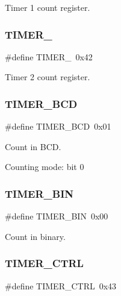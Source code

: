 Timer 1 count register. 

\hypertarget{group__i8254_ga1f34f18ad0ab8cace46b615773b48735}{}\label{group__i8254_ga1f34f18ad0ab8cace46b615773b48735} 
\subsubsection{\texorpdfstring{T\+I\+M\+E\+R\+\_}{TIMER\_2}}
{\footnotesize\ttfamily \#define T\+I\+M\+E\+R\+\_~0x42}



Timer 2 count register. 

\hypertarget{group__i8254_ga325b992a371d5d981c4eceff42fa5956}{}\label{group__i8254_ga325b992a371d5d981c4eceff42fa5956} 
\subsubsection{\texorpdfstring{T\+I\+M\+E\+R\+\_\+\+B\+CD}{TIMER\_BCD}}
{\footnotesize\ttfamily \#define T\+I\+M\+E\+R\+\_\+\+B\+CD~0x01}



Count in B\+CD. 

Counting mode\+: bit 0 \hypertarget{group__i8254_gad2913dcf2f91453317bd035589ac0a7d}{}\label{group__i8254_gad2913dcf2f91453317bd035589ac0a7d} 
\subsubsection{\texorpdfstring{T\+I\+M\+E\+R\+\_\+\+B\+IN}{TIMER\_BIN}}
{\footnotesize\ttfamily \#define T\+I\+M\+E\+R\+\_\+\+B\+IN~0x00}



Count in binary. 

\hypertarget{group__i8254_ga282832448fb0281ef53d243c1cd48491}{}\label{group__i8254_ga282832448fb0281ef53d243c1cd48491} 
\subsubsection{\texorpdfstring{T\+I\+M\+E\+R\+\_\+\+C\+T\+RL}{TIMER\_CTRL}}
{\footnotesize\ttfamily \#define T\+I\+M\+E\+R\+\_\+\+C\+T\+RL~0x43}



